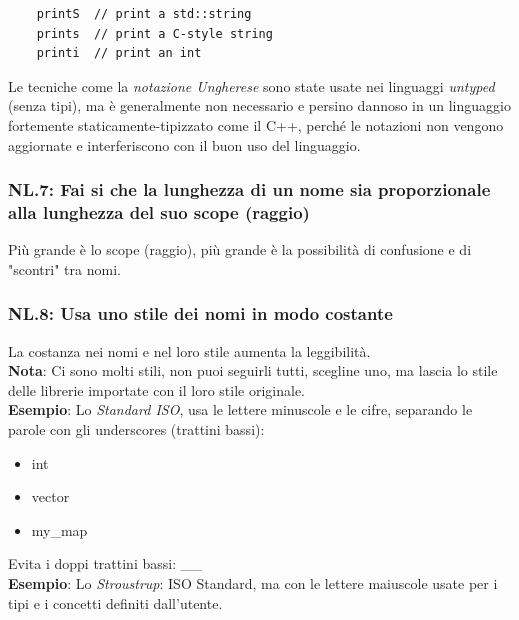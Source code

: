 \begin{lstlisting}
	printS  // print a std::string
	prints  // print a C-style string
	printi  // print an int
\end{lstlisting}

\textsf{\small Le tecniche come la \emph{notazione Ungherese} sono state usate nei linguaggi \emph{untyped} (senza tipi), ma è generalmente non necessario e persino dannoso in un linguaggio fortemente staticamente-tipizzato come il C++, perché le notazioni non vengono aggiornate e interferiscono con il buon uso del linguaggio.} \\

\subsubsection{NL.7: Fai si che la lunghezza di un nome sia proporzionale alla lunghezza del suo scope (raggio)}

\textsf{\small Più grande è lo scope (raggio), più grande è la possibilità di confusione e di "scontri" tra nomi.} \\

\subsubsection{NL.8: Usa uno stile dei nomi in modo costante}

\textsf{\small La costanza nei nomi e nel loro stile aumenta la leggibilità.} \\

\textsf{\small \textbf{Nota}: Ci sono molti stili, non puoi seguirli tutti, scegline uno, ma lascia lo stile delle librerie importate con il loro stile originale.} \\

\textsf{\small \textbf{Esempio}: Lo \emph{Standard ISO}, usa le lettere minuscole e le cifre, separando le parole con gli underscores (trattini bassi):}

\begin{itemize}
	\item \textsf{\small int}
	\item \textsf{\small vector}
	\item \textsf{\small my\_map}
\end{itemize}

\textsf{\small Evita i doppi trattini bassi: \_\_} \\

\textsf{\small \textbf{Esempio}: Lo \emph{Stroustrup}: ISO Standard, ma con le lettere maiuscole usate per i tipi e i concetti definiti dall'utente. }

